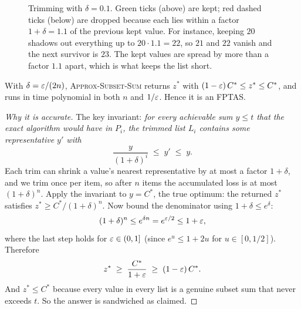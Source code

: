\begin{figure}[h]
\centering
{}
\caption{Trimming with $\delta=0.1$. Green ticks (above) are kept; red dashed
ticks (below) are dropped because each lies within a factor $1+\delta=1.1$ of
the previous kept value. For instance, keeping $20$ shadows out everything up
to $20\cdot1.1=22$, so $21$ and $22$ vanish and the next survivor is $23$. The
kept values are spread by more than a factor $1.1$ apart, which is what keeps
the list short.}
\label{ch34:trim}
\end{figure}

\begin{theorem}
\label{ch34:ss-thm}
With $\delta=\varepsilon/(2n)$, \textsc{Approx-Subset-Sum} returns $z^{*}$ with
$(1-\varepsilon)\,C^{*} \le z^{*} \le C^{*}$, and runs in time polynomial in both $n$
and $1/\varepsilon$. Hence it is an FPTAS.
\end{theorem}

\begin{proof}[Why it is accurate]
The key invariant: \emph{for every achievable sum $y\le t$ that the exact
algorithm would have in $P_i$, the trimmed list $L_i$ contains some
representative $y'$ with}
\[
\frac{y}{(1+\delta)^{i}} \;\le\; y' \;\le\; y .
\]
Each trim can shrink a value's nearest representative by at most a factor
$1+\delta$, and we trim once per item, so after $n$ items the accumulated loss
is at most $(1+\delta)^{n}$. Apply the invariant to $y = C^{*}$, the true
optimum: the returned $z^{*}$ satisfies $z^{*} \ge C^{*}/(1+\delta)^{n}$. Now
bound the denominator using $1+\delta \le e^{\delta}$:
\[
(1+\delta)^{n} \le e^{\delta n} = e^{\varepsilon/2} \le 1 + \varepsilon,
\]
where the last step holds for $\varepsilon\in(0,1]$ (since $e^{u}\le 1+2u$ for
$u\in[0,1/2]$). Therefore
\[
z^{*} \;\ge\; \frac{C^{*}}{1+\varepsilon} \;\ge\; (1-\varepsilon)\,C^{*}.
\]
And $z^{*}\le C^{*}$ because every value in every list is a genuine subset
sum that never exceeds $t$. So the answer is sandwiched as claimed.
\end{proof}

